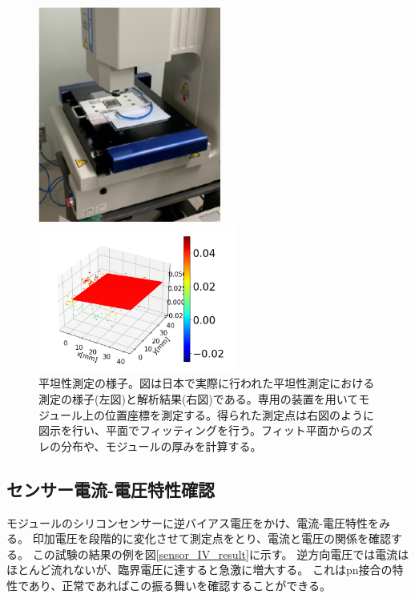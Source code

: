 \begin{figure}[bpt]\centering
  \begin{minipage}{0.4\hsize}
    \begin{center}
    \includegraphics[width=60mm]{Metrology_setup}
    \end{center}
  \end{minipage}
  \begin{minipage}{0.4\hsize}
    \begin{center}
    \includegraphics[width=65mm]{Metrology_analysis}
    \end{center}
  \end{minipage}
  \caption[平坦性測定の様子。]{平坦性測定の様子。図は日本で実際に行われた平坦性測定における測定の様子(左図)と解析結果(右図)である。専用の装置を用いてモジュール上の位置座標を測定する。得られた測定点は右図のように図示を行い、平面でフィッティングを行う。フィット平面からのズレの分布や、モジュールの厚みを計算する。}
  \label{Metrology_overview}
\end{figure}

\clearpage
\subsection{センサー電流-電圧特性確認}
モジュールのシリコンセンサーに逆バイアス電圧をかけ、電流-電圧特性をみる。
印加電圧を段階的に変化させて測定点をとり、電流と電圧の関係を確認する。
この試験の結果の例を図\ref{sensor_IV_result}に示す。
逆方向電圧では電流はほとんど流れないが、臨界電圧に達すると急激に増大する。
これはpn接合の特性\cite{2-1}であり、正常であればこの振る舞いを確認することができる。

